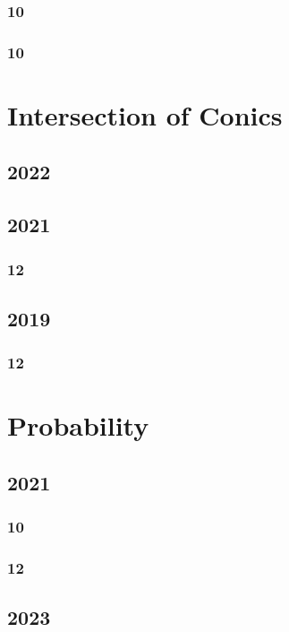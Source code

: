 \documentclass[11pt]{book}
\begin{document}
\subsection{10}

\subsection{10}





\chapter{Intersection of Conics}
\section{2022}

\section{2021}
\subsection{12}

\section{2019}
\subsection{12}








\chapter{Probability}
\section{2021}
\subsection{10}

\subsection{12}

\section{2023}
\end{document}
